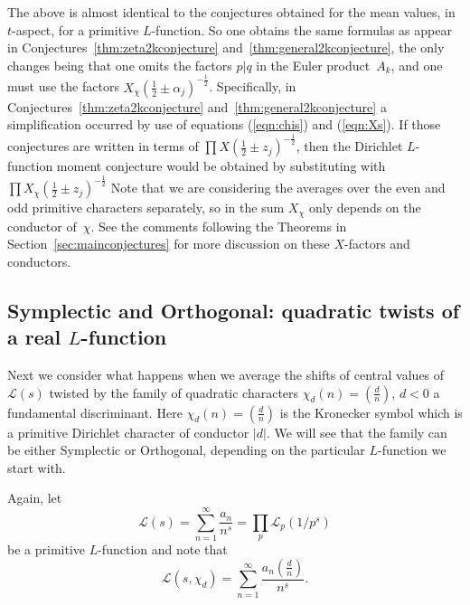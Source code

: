 \documentclass[12pt,letterpaper]{amsart}
\theoremstyle{plain}
\theoremstyle{definition}
\theoremstyle{remark}
\numberwithin{equation}{subsection}
\numberwithin{theorem}{subsection}
\numberwithin{table}{subsection}
\begin{document}
The above is almost identical to the conjectures obtained for the mean values, 
in $t$-aspect, for a primitive $L$-function.  So one obtains the
same formulas as appear in Conjectures~\ref{thm:zeta2kconjecture} 
and~\ref{thm:general2kconjecture}, the only changes
being that one omits the factors $p|q$ in the Euler product~$A_k$,
and one must use the factors $X_\chi(\frac12\pm \alpha_j)^{-\frac12}$.
Specifically, in  Conjectures~\ref{thm:zeta2kconjecture} and~\ref{thm:general2kconjecture}
a simplification occurred by use of equations (\ref{eqn:chis}) and (\ref{eqn:Xs}).
If those conjectures are written in terms of $\prod X(\frac12\pm z_j)^{-\frac12}$, then
the Dirichlet $L$-function moment conjecture would be obtained by substituting
with $\prod X_\chi(\frac12\pm z_j)^{-\frac12}$
Note that we are considering the averages over the even and odd 
primitive characters separately, so  in the sum $X_\chi$ only depends 
on the conductor of~$\chi$.
See the comments following the Theorems in Section~\ref{sec:mainconjectures}
for more discussion on these $X$-factors and conductors.



\subsection{  Symplectic and Orthogonal: quadratic twists of  a
real $L$-function
}\label{sec:symplectic}

Next we consider what happens when we average the shifts of
central values of  $\mathcal{L}(s)$ twisted by the family of quadratic
characters $\displaystyle \chi_d(n)=\left(\frac{d}{n}\right)$,
$d<0$ a fundamental discriminant.  Here $\displaystyle
\chi_d(n)=\left(\frac{d}{n}\right)$ is the Kronecker symbol which
is a primitive Dirichlet character of conductor $|d|$.  
We will see that the family can be either Symplectic or Orthogonal,
depending on the particular $L$-function we start with.

Again, let
\begin{equation}
\mathcal{L}(s)=\sum_{n=1}^\infty \frac{a_n}{n^s}=\prod_p
\mathcal{L}_p(1/p^s)
\end{equation}
be a primitive $L$-function and note that
\begin{equation}
\mathcal{L}(s,\chi_d)= \sum_{n=1}^\infty \frac {a_n
\left(\frac{d}{n}\right)}{n^s}.
\end{equation}
\end{document}
